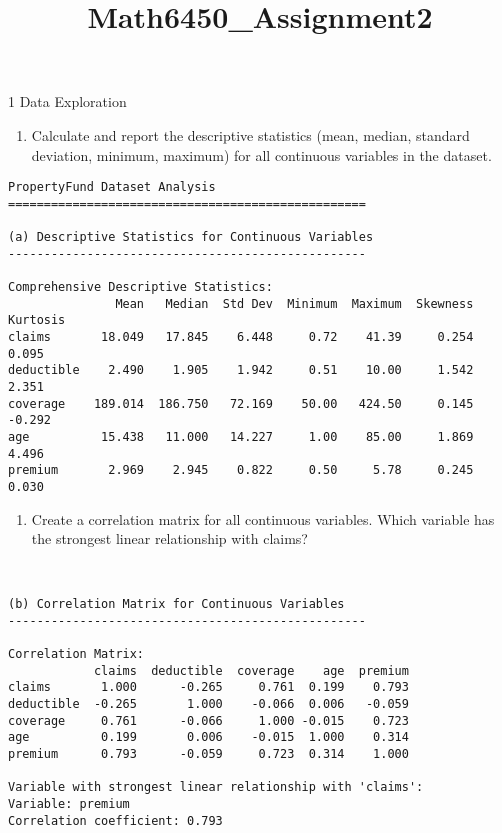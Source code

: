 \documentclass[8pt, twocolumn]{extarticle}
\title{Math6450\_Assignment2}
\providecommand{\tightlist}{%
      \setlength{\itemsep}{0pt}\setlength{\parskip}{0pt}}
\begin{document}
    
    \maketitle
    
    

    
    1 Data Exploration

    \begin{enumerate}
\def\labelenumi{(\alph{enumi})}
\tightlist
\item
  Calculate and report the descriptive statistics (mean, median,
  standard deviation, minimum, maximum) for all continuous variables in
  the dataset.
\end{enumerate}

    \begin{Verbatim}[commandchars=\\\{\}]
PropertyFund Dataset Analysis
==================================================

(a) Descriptive Statistics for Continuous Variables
--------------------------------------------------

Comprehensive Descriptive Statistics:
               Mean   Median  Std Dev  Minimum  Maximum  Skewness  Kurtosis
claims       18.049   17.845    6.448     0.72    41.39     0.254     0.095
deductible    2.490    1.905    1.942     0.51    10.00     1.542     2.351
coverage    189.014  186.750   72.169    50.00   424.50     0.145    -0.292
age          15.438   11.000   14.227     1.00    85.00     1.869     4.496
premium       2.969    2.945    0.822     0.50     5.78     0.245     0.030
    \end{Verbatim}

    \begin{enumerate}
\def\labelenumi{(\alph{enumi})}
\setcounter{enumi}{1}
\tightlist
\item
  Create a correlation matrix for all continuous variables. Which
  variable has the strongest linear relationship with claims?
\end{enumerate}

    \begin{Verbatim}[commandchars=\\\{\}]


(b) Correlation Matrix for Continuous Variables
--------------------------------------------------

Correlation Matrix:
            claims  deductible  coverage    age  premium
claims       1.000      -0.265     0.761  0.199    0.793
deductible  -0.265       1.000    -0.066  0.006   -0.059
coverage     0.761      -0.066     1.000 -0.015    0.723
age          0.199       0.006    -0.015  1.000    0.314
premium      0.793      -0.059     0.723  0.314    1.000

Variable with strongest linear relationship with 'claims':
Variable: premium
Correlation coefficient: 0.793
    \end{Verbatim}
\end{document}
